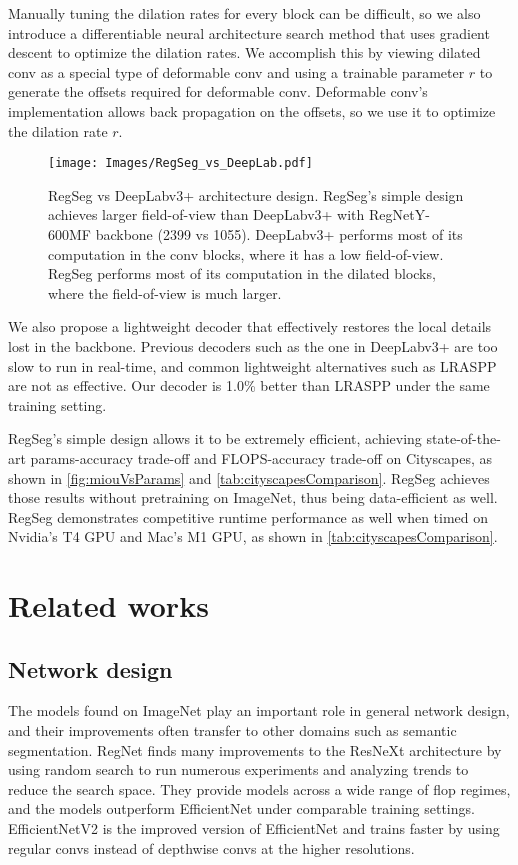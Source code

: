 \documentclass[10pt,twocolumn,letterpaper]{article}
\begin{document}
Manually tuning the dilation rates for every block can be difficult, so we also introduce a differentiable neural architecture search method that uses gradient descent to optimize the dilation rates. We accomplish this by viewing dilated conv as a special type of deformable conv\cite{dai2017deformable} and using a trainable parameter $r$ to generate the offsets required for deformable conv. Deformable conv's implementation allows back propagation on the offsets, so we use it to optimize the dilation rate $r$.

\begin{figure}
  \centering
    \texttt{[image: Images/RegSeg\_vs\_DeepLab.pdf]}

   \caption{RegSeg vs DeepLabv3+ architecture design. RegSeg's simple design achieves larger field-of-view than DeepLabv3+ with RegNetY-600MF backbone (2399 vs 1055). DeepLabv3+ performs most of its computation in the conv blocks, where it has a low field-of-view. RegSeg performs most of its computation in the dilated blocks, where the field-of-view is much larger.}
   \label{fig:regseg_vs_deeplab}
\end{figure}

We also propose a lightweight decoder that effectively restores the local details lost in the backbone. Previous decoders such as the one in DeepLabv3+\cite{deeplabv3plus2018} are too slow to run in real-time, and common lightweight alternatives such as LRASPP\cite{mobilenetv32019} are not as effective. Our decoder is 1.0\% better than LRASPP under the same training setting.

RegSeg's simple design allows it to be extremely efficient, achieving state-of-the-art params-accuracy trade-off and FLOPS-accuracy trade-off on Cityscapes\cite{cityscapes}, as shown in \cref{fig:miouVsParams} and \cref{tab:cityscapesComparison}. RegSeg achieves those results without pretraining on ImageNet\cite{deng2009imagenet}, thus being data-efficient as well. RegSeg demonstrates competitive runtime performance as well when timed on Nvidia's T4 GPU and Mac's M1 GPU, as shown in \cref{tab:cityscapesComparison}.



\section{Related works}
\subsection{Network design}
The models found on ImageNet play an important role in general network design, and their improvements often transfer to other domains such as semantic segmentation. RegNet\cite{regnet,regnetz} finds many improvements to the ResNeXt\cite{resnext} architecture by using random search to run numerous experiments and analyzing trends to reduce the search space. They provide models across a wide range of flop regimes, and the models outperform EfficientNet\cite{tan2019efficientnet} under comparable training settings. EfficientNetV2\cite{efficientnetv2} is the improved version of EfficientNet and trains faster by using regular convs instead of depthwise convs at the higher resolutions.
\end{document}
